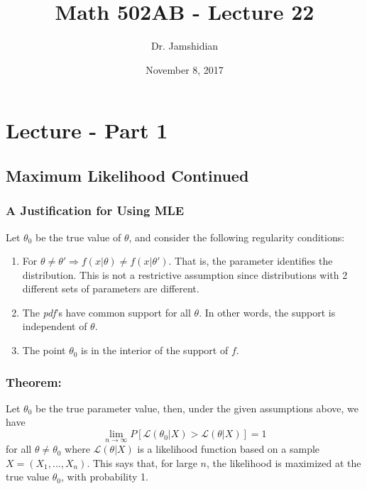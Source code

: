 \documentclass{article}
\title{Math 502AB - Lecture 22}
\author{Dr. Jamshidian}
\date{November 8, 2017}
\begin{document}
\maketitle

\section{Lecture - Part 1}
\subsection{Maximum Likelihood Continued}
\subsubsection{A Justification for Using MLE}

Let $\theta_0$ be the true value of $\theta$, and consider the following regularity conditions:
\begin{enumerate}
    \item For $\theta \neq \theta' \Rightarrow f(x|\theta) \neq f(x|\theta')$. That is, the parameter identifies the distribution. This is not a restrictive assumption since distributions with 2 different sets of parameters are different.
    \item The \textit{pdf}'s have common support for all $\theta$. In other words, the support is independent of $\theta$.
    \item The point $\theta_0$ is in the interior of the support of $f$.
\end{enumerate}

\subsubsection{Theorem:}
Let $\theta_0$ be the true parameter value, then, under the given assumptions above, we have
\begin{equation*}
    \lim_{n\to\infty} P\left[\mathcal{L}(\theta_0|X) > \mathcal{L}(\theta|X) \right] = 1
\end{equation*}
for all $\theta \neq \theta_0$ where $\mathcal{L}(\theta|X)$ is a likelihood function based on a sample $X = (X_1,...,X_n)$. This says that, for large $n$, the likelihood is maximized at the true value $\theta_0$, with probability 1.
\end{document}
